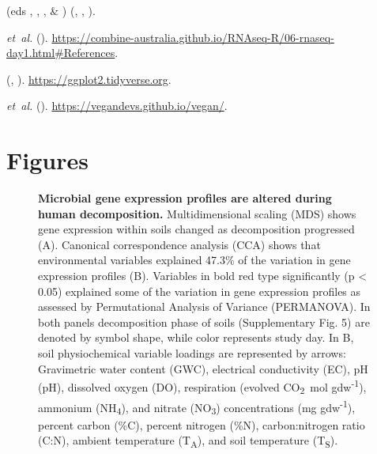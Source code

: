 \documentclass[
  sn-nature,
  lineno, referee]{sn-jnl}
\begin{document}
\begin{thebibliography}{10}
  \newblock {} (eds , , ,  \& ) \emph{}  (, , ).
  
   \emph{et~al.}
  \newblock {} ().
  \newblock \urlprefix\url{https://combine-australia.github.io/RNAseq-R/06-rnaseq-day1.html#References}.
  
  \newblock \emph{}  (, ).
  \newblock \urlprefix\url{https://ggplot2.tidyverse.org}.
  
   \emph{et~al.}
  \newblock \emph{}  ().
  \newblock \urlprefix\url{https://vegandevs.github.io/vegan/}.
  
  \end{thebibliography}
  
\newpage

\section{Figures}\label{figures}

\begin{figure}[!h]
\caption{{\bf Microbial gene expression profiles are altered during human decomposition.}
Multidimensional scaling (MDS) shows gene expression within soils changed as decomposition progressed (A). Canonical correspondence analysis (CCA) shows that environmental variables explained 47.3\% of the variation in gene expression profiles (B). Variables in bold red type significantly (p < 0.05) explained some of the variation in gene expression profiles as assessed by Permutational Analysis of Variance (PERMANOVA). In both panels decomposition phase of soils (Supplementary Fig. 5) are denoted by symbol shape, while color represents study day. In B, soil physiochemical variable loadings are represented by arrows: Gravimetric water content (GWC), electrical conductivity (EC), pH (pH), dissolved oxygen (DO), respiration (evolved CO\textsubscript{2}\ \textmu mol gdw\textsuperscript{-1}), ammonium (NH\textsubscript{4}), and nitrate (NO\textsubscript{3}) concentrations (mg gdw\textsuperscript{-1}), percent carbon (\%C), percent nitrogen (\%N), carbon:nitrogen ratio (C:N), ambient temperature (T\textsubscript{A}), and soil temperature (T\textsubscript{S}).}
\label{fig-mds}
\end{figure}
\end{document}
